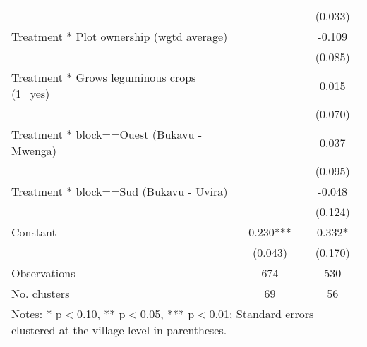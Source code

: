 \begin{table}[htbp]
\begin{tabular}{l*{2}{c}}
                    &               &     (0.033)   \\
Treatment * Plot ownership (wgtd average)&               &      -0.109   \\
                    &               &     (0.085)   \\
Treatment * Grows leguminous crops (1=yes)&               &       0.015   \\
                    &               &     (0.070)   \\
Treatment * block==Ouest (Bukavu - Mwenga)&               &       0.037   \\
                    &               &     (0.095)   \\
Treatment * block==Sud (Bukavu - Uvira)&               &      -0.048   \\
                    &               &     (0.124)   \\
Constant            &       0.230***&       0.332*  \\
                    &     (0.043)   &     (0.170)   \\
\hline
Observations        &         674   &         530   \\
No. clusters        &          69   &          56   \\
\hline\hline
\multicolumn{3}{l}{\footnotesize Notes: * p$<$0.10, ** p$<$0.05, *** p$<$0.01; Standard errors clustered at the village level in parentheses.}\\
\end{tabular}
\end{table}
